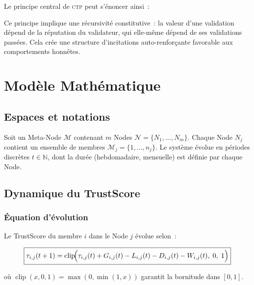 \documentclass[12pt,a4paper]{article}
\theoremstyle{definition}
\theoremstyle{plain}
\theoremstyle{remark}
\newcommand{\CTP}{\textsc{ctp}}
\newcommand{\trustscore}{\tau}
\newcommand{\N}{\mathbb{N}}
\newcommand{\1}{\mathbf{1}}
\newcommand{\clip}{\operatorname{clip}}
\begin{document}
Le principe central de \CTP{} peut s'énoncer ainsi~:

\begin{center}
\end{center}

Ce principe implique une récursivité constitutive~: la valeur d'une validation
dépend de la réputation du validateur, qui elle-même dépend de ses validations
passées. Cela crée une structure d'incitations auto-renforçante favorable aux
comportements honnêtes.

\section{Modèle Mathématique}
\label{sec:modele}

\subsection{Espaces et notations}

Soit un Meta-Node $\mathcal{M}$ contenant $m$ Nodes $\mathcal{N} = \{N_1,
\ldots, N_m\}$. Chaque Node $N_j$ contient un ensemble de membres
$\mathcal{M}_j = \{1, \ldots, n_j\}$. Le système évolue en périodes discrètes
$t \in \N$, dont la durée (hebdomadaire, mensuelle) est définie par chaque
Node.

\subsection{Dynamique du TrustScore}

\subsubsection{Équation d'évolution}

Le TrustScore du membre $i$ dans le Node $j$ évolue selon~:

\begin{equation}
\boxed{
\trustscore_{i,j}(t+1) = \clip\!\Bigl(
  \trustscore_{i,j}(t) + G_{i,j}(t) - L_{i,j}(t) - D_{i,j}(t) - W_{i,j}(t),\;
  0,\; 1
\Bigr)
}
\label{eq:trust}
\end{equation}

où $\clip(x, 0, 1) = \max(0, \min(1, x))$ garantit la bornitude dans $[0,1]$.
\end{document}
